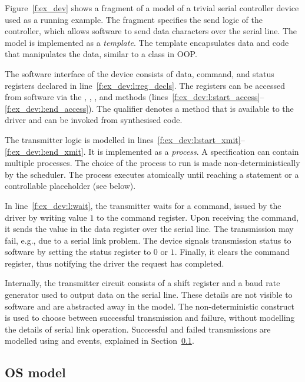 Figure~\ref{f:ex_dev} shows a fragment of a model of a trivial serial controller device used as a running example.  The fragment specifies the send logic of the controller, which allows software to send data characters over the serial line.  The model is implemented as a \tsl \emph{template}.  The template encapsulates data and code that manipulates the data, similar to a class in OOP.

The software interface of the device consists of data, command, and status registers declared in line~\ref{f:ex_dev:l:reg_decls}.  The registers can be accessed from software via the , , , and  methods (lines~\ref{f:ex_dev:l:start_access}--\ref{f:ex_dev:l:end_access}).  The  qualifier denotes a method that is available to the driver and can be invoked from synthesised code.

The transmitter logic is modelled in lines~\ref{f:ex_dev:l:start_xmit}--\ref{f:ex_dev:l:end_xmit}.  It is implemented as a \tsl \emph{process}.  A \tsl specification can contain multiple processes.  The choice of the process to run is made non-deterministically by the scheduler.  The process executes atomically until reaching a  statement or a controllable placeholder (see below).

In line~\ref{f:ex_dev:l:wait}, the transmitter waits for a command, issued by the driver by writing value $1$ to the command register.  Upon receiving the command, it sends the value in the data register over the serial line.  The transmission may fail, e.g., due to a serial link problem.  The device signals transmission status to software by setting the status register to $0$ or $1$.  Finally, it clears the command register, thus notifying the driver the request has completed.

Internally, the transmitter circuit consists of a shift register and a baud rate generator used to output data on the serial line.  These details are not visible to software and are abstracted away in the model.  The non-deterministic  construct is used to choose between successful transmission and failure, without modelling the details of serial link operation.  Successful and failed transmissions are modelled using and  events, explained in Section~\ref{s:os}.

\subsection{OS model}\label{s:os}

